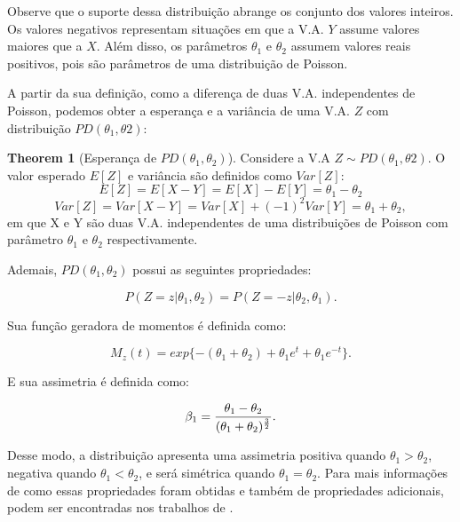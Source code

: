 \documentclass[12pt]{article}
\theoremstyle{definition}
\newtheorem{theorem}{Theorem}
\begin{document}
Observe que o suporte dessa distribuição abrange os conjunto dos valores inteiros. Os valores negativos representam situações em que a V.A. $Y$ assume valores maiores que a $X$. Além disso, os parâmetros $\theta_1$ e $\theta_2$ assumem valores reais positivos, pois são parâmetros de uma distribuição de Poisson.

A partir da sua definição, como a diferença de duas V.A. independentes de Poisson, podemos obter a esperança e a variância de uma V.A. $Z$ com distribuição $PD(\theta_1, \theta2)$:

\begin{theorem}[Esperança de $PD(\theta_1, \theta_2)$]
    Considere a V.A $Z \sim PD(\theta_1, \theta2)$. O valor esperado $E[Z]$ e variância são definidos como $Var[Z]$:
    \begin{equation*}
        E[Z] = E[X - Y] = E[X] - E[Y] = \theta_1 - \theta_2
    \end{equation*}
    \begin{equation*}
        Var[Z] = Var[X-Y] = Var[X] + (-1)^2Var[Y] = \theta_1 + \theta_2,
    \end{equation*}
em que X e Y são duas V.A. independentes de uma distribuições de Poisson com parâmetro $\theta_1$ e $\theta_2$ respectivamente.
\end{theorem}

Ademais, $PD(\theta_1, \theta_2)$ possui as seguintes propriedades:

\begin{equation*}
    P(Z=z | \theta_1, \theta_2) = P(Z=-z | \theta_2, \theta_1).
\end{equation*}

Sua função geradora de momentos é definida como:

\begin{equation*}
    M_z(t) = exp\{ -(\theta_1 + \theta_2) + \theta_1 e^t  + \theta_1 e^{-t} \}.
\end{equation*}


E sua assimetria é definida como:

\begin{equation*}
    \beta_1 = {\theta_1 - \theta_2 \over ( \theta_1 + \theta_2)^{3 \over 2}}.
\end{equation*}

Desse modo, a distribuição apresenta uma assimetria positiva quando $\theta_1 > \theta_2$, negativa quando $\theta_1 < \theta_2$, e será simétrica quando $\theta_1 = \theta_2$. Para mais informações de como essas propriedades foram obtidas e também de propriedades adicionais, podem ser encontradas nos trabalhos de \cite{karlis2008,alzaid2010}.
\end{document}
